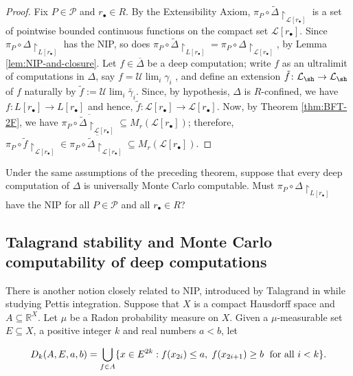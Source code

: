 \begin{proof}
    Fix $P\in\mathcal{P}$ and $r_\bullet\in R$.
    By the Extensibility Axiom, $\pi_P\circ\tilde\Delta\restriction_{\mathcal{L}[r_\bullet]}$ is a set of pointwise bounded continuous functions on the compact set $\mathcal{L}[r_\bullet]$.
    Since $\pi_P\circ\Delta\restriction_{L[r_\bullet]}$ has the NIP, so does $\pi_P\circ\tilde\Delta\restriction_{L[r_\bullet]}=\pi_P\circ\Delta\restriction_{\mathcal{L}[r_\bullet]}$, by Lemma \ref{lem:NIP-and-closure}.
    Let $f\in\overline{\Delta}$ be a deep computation;
     write $f$ as an ultralimit of computations in $\Delta$, say $f=\mathcal{U}\lim_i\gamma_i$ , and
    define an extension $\tilde{f}\colon\mathcal{L}_{\sh}\to \mathcal{L}_{\sh}$ of $f$ naturally by $\tilde{f}:=\mathcal{U}\lim_i\tilde{\gamma_i}$.
    Since, by hypothesis, $\Delta$ is $R$-confined, we have $f\colon L[r_\bullet]\to L[r_\bullet]$ and hence, $\tilde{f}\colon\mathcal{L}[r_\bullet]\to \mathcal{L}[r_\bullet]$.
    Now, by Theorem \ref{thm:BFT-2F}, we have $\overline{\pi_P\circ\tilde\Delta\restriction_{\mathcal{L}[r_\bullet]}}\subseteq M_r(\mathcal{L}[r_\bullet])$; therefore, $\pi_P \circ \tilde{f}\restriction_{\mathcal{L}[r_\bullet]}\in \overline{\pi_P\circ\tilde\Delta\restriction_{\mathcal{L}[r_\bullet]}}\subseteq M_r(\mathcal{L}[r_\bullet])$.
\end{proof}

\begin{question}
    Under the same assumptions of the preceding theorem, suppose that every deep computation of $\Delta$ is universally Monte Carlo computable.
    Must $\pi_P\circ\Delta\restriction_{L[r_\bullet]}$ have the NIP for all $P\in\mathcal{P}$ and all $r_{\bullet}\in R$?
\end{question}

\subsection{Talagrand stability and Monte Carlo computability of deep computations}

There is another notion closely related to NIP, introduced by Talagrand in \cite{talagrand1984pettis} while studying Pettis integration.
Suppose that $X$ is a compact Hausdorff space and $A\subseteq \mathbb{R}^X$.
Let $\mu$ be a Radon probability measure on $X$.
Given a $\mu$-measurable set $E\subseteq X$, a positive integer $k$ and real numbers $a<b$, let

\[
	D_k(A,E,a,b)=\bigcup_{f\in A}\{x\in E^{2k}:f(x_{2i})\leq a, \hspace{1mm} f(x_{2i+1})\geq b \hspace{1mm}{\text{ for all }i<k} \}.
\]

